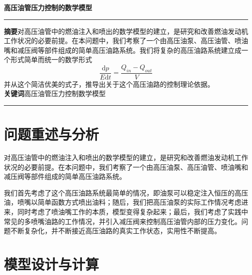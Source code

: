 \documentclass[12pt,AutoFakeBold]{article}%
\newcommand{\dif}{\mathrm{d}}
\begin{document}
    \vspace*{4cm}
    \begin{center}
        \Huge{\textbf{高压油管压力控制的数学模型}}
    \end{center}
    \vspace*{5cm}
    \rule{\textwidth}{1mm}
    \large{    
    \textbf{摘要}\quad 对高压油管中的燃油注入和喷出的数学模型的建立，是研究和改善燃油发动机工作状况的必要前提。在本问题中，我们考察了一个由高压油泵、高压油管、喷油嘴和减压阀等部件组成的简单高压油路系统。我们将复杂的高压油路系统建立成一个形式简单而统一的数学形式
    \[\frac{\dif p}{E\dif t}=\frac{Q_{in}-Q_{out}}{V}\]
    并从这个简洁优美的式子，推导出关于这个高压油路的控制理论依据。\\
    \textbf{关键词}\quad 高压油管\quad 压力控制\quad 数学模型\\
    }
    \rule{\textwidth}{1mm}
    \newpage
    \section{问题重述与分析}
    对高压油管中的燃油注入和喷出的数学模型的建立，是研究和改善燃油发动机工作状况的必要前提。在本问题中，我们考察了一个由高压油泵、高压油管、喷油嘴和减压阀等部件组成的简单高压油路系统。\par
    我们首先考虑了这个高压油路系统最简单的情况，即油泵可以稳定注入恒压的高压油，喷嘴以简单函数方式喷出油料；随后，我们把高压油泵的实际工作情况考虑进来，同时考虑了喷油嘴工作的本质，模型变得复杂起来；最后，我们考虑了实践中常见的多喷嘴油路的工作情况，并引入减压阀来控制高压油管内部的压力变化。问题不断复杂化，并不断接近高压油路的真实工作状态，实用性不断提高。\par

    \section{模型设计与计算}
\end{document}
